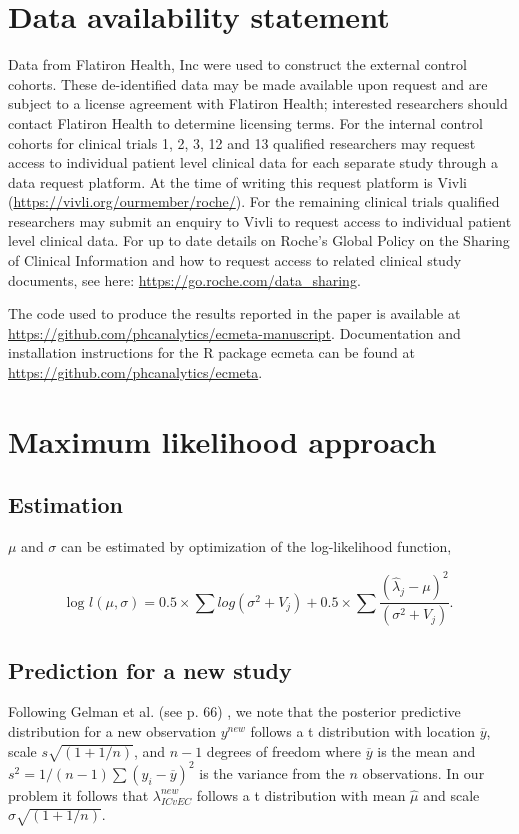 \documentclass[11pt,final,fleqn]{article}\usepackage[]{graphicx}\usepackage[]{color}
\newcommand{\pkg}[1]{{\fontseries{m}\fontseries{b}\selectfont #1}}
\begin{document}



\section*{Data availability statement}
Data from Flatiron Health, Inc were used to construct the external control cohorts. These de-identified data may be made available upon request and are subject to a license agreement with Flatiron Health; interested researchers should contact Flatiron Health to determine licensing terms. For the internal control cohorts for clinical trials 1, 2, 3, 12 and 13 qualified researchers may request access to individual patient level clinical data for each separate study through a data request platform. At the time of writing this request platform is Vivli (\url{https://vivli.org/ourmember/roche/}). For the remaining clinical trials qualified researchers may submit an enquiry to Vivli to request access to individual patient level clinical data. For up to date details on Roche's Global Policy on the Sharing of Clinical Information and how to request access to related clinical study documents, see here:  \url{https://go.roche.com/data_sharing}.

The code used to produce the results reported in the paper is available at \url{https://github.com/phcanalytics/ecmeta-manuscript}. Documentation and installation instructions for the \textsf{R} package \pkg{ecmeta} can be found at \url{https://github.com/phcanalytics/ecmeta}. 


\appendix
\renewcommand\thefigure{\thesection.\arabic{figure}}    
\setcounter{figure}{0} 

\section{Maximum likelihood approach} \label{appendix:ml}
\subsection{Estimation}
$\mu$ and $\sigma$ can be estimated by optimization of the log-likelihood function,

\begin{equation}
\text{log } l(\mu,\sigma) = 0.5 \times \sum{log(\sigma^2+V_j)} +
0.5 \times \sum{ \frac{(\hat\lambda_j-\mu)^2}{(\sigma^2+V_j)} }.
\end{equation}

\subsection{Prediction for a new study}
Following Gelman et al. (see p. 66) \cite{gelman2013bayesian}, we note that the posterior predictive distribution for a new observation $y^{new}$ follows a t distribution with location $\overline{y}$, scale $s\sqrt{(1 + 1/n)}$, and $n-1$ degrees of freedom where $\overline{y}$ is the mean and $s^2=1/(n-1)\sum (y_i - \overline{y})^2$ is the variance from the $n$ observations. In our problem it follows that $\lambda_{ICvEC}^{new}$ follows a t distribution with mean $\hat{\mu}$ and scale $\hat{\sigma}\sqrt{(1 + 1/n)}$.
\end{document}
